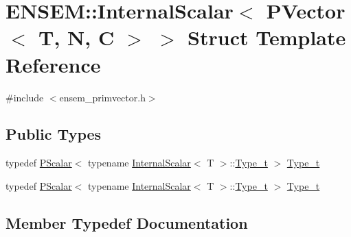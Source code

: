 \hypertarget{structENSEM_1_1InternalScalar_3_01PVector_3_01T_00_01N_00_01C_01_4_01_4}{}\section{E\+N\+S\+EM\+:\+:Internal\+Scalar$<$ P\+Vector$<$ T, N, C $>$ $>$ Struct Template Reference}
\label{structENSEM_1_1InternalScalar_3_01PVector_3_01T_00_01N_00_01C_01_4_01_4}


{\ttfamily \#include $<$ensem\+\_\+primvector.\+h$>$}

\subsection*{Public Types}
\begin{DoxyCompactItemize}
\item 
typedef \mbox{\hyperlink{classENSEM_1_1PScalar}{P\+Scalar}}$<$ typename \mbox{\hyperlink{structENSEM_1_1InternalScalar}{Internal\+Scalar}}$<$ T $>$\+::\mbox{\hyperlink{structENSEM_1_1InternalScalar_3_01PVector_3_01T_00_01N_00_01C_01_4_01_4_a3d48341b473eb19411a82b36c48559cc}{Type\+\_\+t}} $>$ \mbox{\hyperlink{structENSEM_1_1InternalScalar_3_01PVector_3_01T_00_01N_00_01C_01_4_01_4_a3d48341b473eb19411a82b36c48559cc}{Type\+\_\+t}}
\item 
typedef \mbox{\hyperlink{classENSEM_1_1PScalar}{P\+Scalar}}$<$ typename \mbox{\hyperlink{structENSEM_1_1InternalScalar}{Internal\+Scalar}}$<$ T $>$\+::\mbox{\hyperlink{structENSEM_1_1InternalScalar_3_01PVector_3_01T_00_01N_00_01C_01_4_01_4_a3d48341b473eb19411a82b36c48559cc}{Type\+\_\+t}} $>$ \mbox{\hyperlink{structENSEM_1_1InternalScalar_3_01PVector_3_01T_00_01N_00_01C_01_4_01_4_a3d48341b473eb19411a82b36c48559cc}{Type\+\_\+t}}
\end{DoxyCompactItemize}


\subsection{Member Typedef Documentation}
\mbox{\label{structENSEM_1_1InternalScalar_3_01PVector_3_01T_00_01N_00_01C_01_4_01_4_a3d48341b473eb19411a82b36c48559cc}} 
